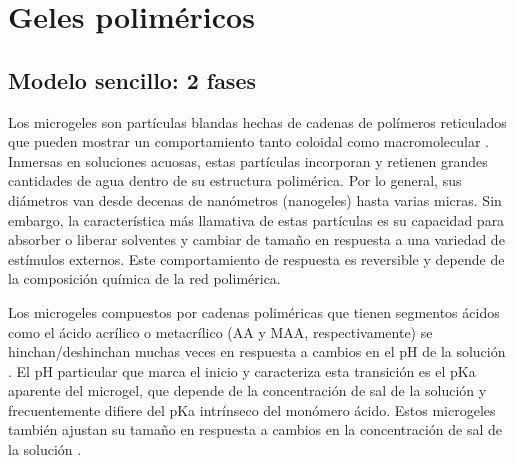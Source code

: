 
\chapter{Geles polim\'ericos} %

\label{Chapter3} %


\newcommand{\keyword}[1]{\textbf{#1}}
\newcommand{\tabhead}[1]{\textbf{#1}}
\newcommand{\code}[1]{\texttt{#1}}
\newcommand{\file}[1]{\texttt{\bfseries#1}}
\newcommand{\option}[1]{\texttt{\itshape#1}}


\section{Modelo sencillo: 2 fases}

Los microgeles son part\'iculas blandas hechas de cadenas de pol\'imeros reticulados que pueden mostrar un comportamiento tanto coloidal como macromolecular .
Inmersas en soluciones acuosas, estas part\'iculas incorporan y retienen grandes cantidades de agua dentro de su estructura polim\'erica.
Por lo general, sus di\'ametros van desde decenas de nan\'ometros (nanogeles) hasta varias micras.
Sin embargo, la caracter\'istica m\'as llamativa de estas part\'iculas es su capacidad para absorber o liberar solventes y cambiar de tama\~no en respuesta a una variedad de est\'imulos externos.
Este comportamiento de respuesta es reversible y depende de la composici\'on qu\'imica de la red polim\'erica.


Los microgeles compuestos por cadenas polim\'ericas que tienen segmentos \'acidos como el \'acido acr\'ilico o metacr\'ilico (AA y MAA, respectivamente) se hinchan/deshinchan muchas veces en respuesta a cambios en el pH de la soluci\'on .
El pH particular que marca el inicio y caracteriza esta transici\'on es el pKa aparente del microgel, que depende de la concentraci\'on de sal de la soluci\'on y frecuentemente difiere del pKa intrínseco del mon\'omero \'acido.
Estos microgeles tambi\'en ajustan su tama\~no en respuesta a cambios en la concentraci\'on de sal de la soluci\'on \addcite[snowden1996].

